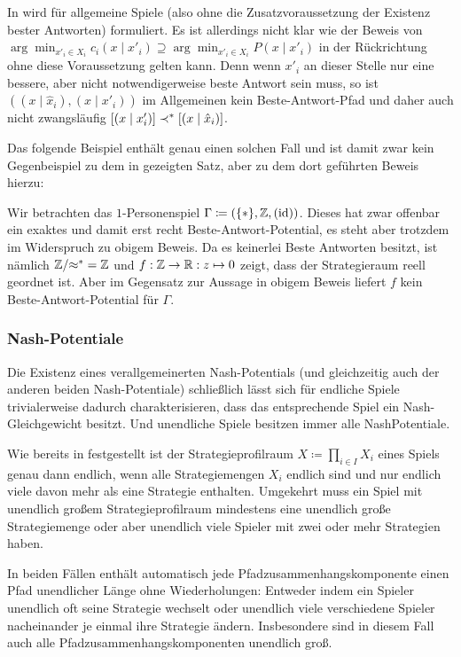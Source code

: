 \begin{bem}
	In \cite{BestRespPot} wird  für allgemeine Spiele (also ohne die Zusatzvoraussetzung der Existenz bester Antworten) formuliert. Es ist allerdings nicht klar wie der Beweis von $\arg \min_{x'_i \in X_i}c_i(x \mid x'_i) \supseteq \arg \min_{x'_i \in X_i} P(x \mid x'_i)$ in der Rückrichtung ohne diese Voraussetzung gelten kann. Denn wenn $x'_i$ an dieser Stelle nur eine bessere, aber nicht notwendigerweise beste Antwort sein muss, so ist $((x \mid \hat{x}_i), (x \mid x'_i))$ im Allgemeinen kein Beste-Antwort-Pfad und daher auch nicht zwangsläufig $[(x \mid x'_i)] \prec^\ast [(x \mid \hat{x}_i)]$.
\end{bem}
Das folgende Beispiel enthält genau einen solchen Fall und ist damit zwar kein Gegenbeispiel zu dem in \cite{BestRespPot} gezeigten Satz, aber zu dem dort geführten Beweis hierzu:

\begin{bsp}
	Wir betrachten das $1$-Personenspiel $\Gamma \coloneqq (\{\ast\}, \mathbb{Z}, (\mathrm{id}))$. Dieses hat zwar offenbar ein exaktes und damit erst recht Beste-Antwort-Potential, es steht aber trotzdem im Widerspruch zu obigem Beweis. Da es keinerlei Beste Antworten besitzt, ist nämlich $\mathbb{Z}/{\approx^\ast} = \mathbb{Z}$ und $f: \mathbb{Z} \to \mathbb{R}: z \mapsto 0$ zeigt, dass der Strategieraum reell geordnet ist. Aber im Gegensatz zur Aussage in obigem Beweis liefert $f$ kein Beste-Antwort-Potential für $\Gamma$.
\end{bsp}


\subsubsection{Nash-Potentiale}

Die Existenz eines verallgemeinerten Nash-Potentials (und gleichzeitig auch der anderen beiden Nash-Potentiale) schließlich lässt sich für endliche Spiele trivialerweise dadurch charakterisieren, dass das entsprechende Spiel ein Nash-Gleichgewicht besitzt. Und unendliche Spiele besitzen immer alle NashPotentiale.

\begin{beob}
	Wie bereits in  festgestellt ist der Strategieprofilraum $X \coloneqq \prod_{i \in I}X_i$ eines Spiels genau dann endlich, wenn alle Strategiemengen $X_i$ endlich sind und nur endlich viele davon mehr als eine Strategie enthalten. Umgekehrt muss ein Spiel mit unendlich großem Strategieprofilraum mindestens eine unendlich große Strategiemenge oder aber unendlich viele Spieler mit zwei oder mehr Strategien haben.
	
	In beiden Fällen enthält automatisch jede Pfadzusammenhangskomponente einen Pfad unendlicher Länge ohne Wiederholungen: Entweder indem ein Spieler unendlich oft seine Strategie wechselt oder unendlich viele verschiedene Spieler nacheinander je einmal ihre Strategie ändern. Insbesondere sind in diesem Fall auch alle Pfadzusammenhangskomponenten unendlich groß.
\end{beob}

